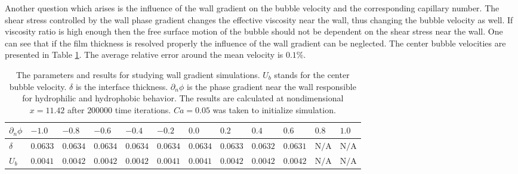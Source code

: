 \documentclass{article}
\begin{document}
Another question which arises is the influence of the wall gradient on the bubble velocity and the
corresponding capillary number. The shear stress controlled by the wall phase gradient changes the
effective viscosity near the wall, thus changing the bubble velocity as well. If viscosity ratio is
high enough then the free surface motion of the bubble should not be dependent on the shear stress
near the wall.
One can see that if the film thickness is resolved properly the influence of the wall gradient can
be neglected. The center bubble velocities are presented in Table
\ref{table:parameters:wall:gradient}. 
The average relative error around the mean velocity is $0.1\%$.
\begin{table}
\begin{tabularx}{\textwidth}{|X|X X X X X X X X X X X|}
\hline
$\scriptstyle \partial_n \phi$& $\scriptstyle -1.0$& $\scriptstyle -0.8$&
$\scriptstyle -0.6$&$\scriptstyle -0.4$&$\scriptstyle -0.2$&$\scriptstyle
0.0$&$\scriptstyle 0.2$&$\scriptstyle 0.4$&$\scriptstyle 0.6$&$\scriptstyle 0.8$&$\scriptstyle
1.0$\\
\hline
$\scriptstyle \delta$& $\scriptstyle 0.0633$& $\scriptstyle 0.0634$& $\scriptstyle 0.0634$&
$\scriptstyle 0.0634$& $\scriptstyle 0.0634$& $\scriptstyle 0.0634$& $\scriptstyle 0.0633$&
$\scriptstyle 0.0632$& $\scriptstyle 0.0631$ &$\scriptstyle \mathrm{N/A}$&$\scriptstyle
\mathrm{N/A}$\\
\hline
$\scriptstyle U_{b}$ &$\scriptstyle 0.0041$& $\scriptstyle 0.0042$& $\scriptstyle 0.0042$
&$\scriptstyle 0.0042$ & $\scriptstyle 0.0041$& $\scriptstyle 0.0041$ & $\scriptstyle 0.0042$ &
$\scriptstyle 0.0042$ & $\scriptstyle 0.0042$ & $\scriptstyle \mathrm{N/A}$ &$\scriptstyle
\mathrm{N/A}$\\
\hline
\end{tabularx}
\caption{The parameters and results for studying wall gradient simulations. $U_{b}$ stands for the
center bubble velocity. $\delta$ is the interface thickness. $\partial_n \phi$ is the phase
gradient near the wall responsible for hydrophilic and hydrophobic behavior. The results are
calculated at nondimensional $x=11.42$ after $200000$ time iterations. $Ca=0.05$ was taken to
initialize simulation.
\label{table:parameters:wall:gradient}}
\end{table}
\end{document}
